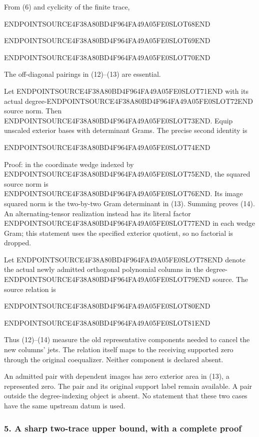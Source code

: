 From (6) and cyclicity of the finite trace,

ENDPOINTSOURCE4F38A80BD4F964FA49A05FE0SLOT68END

ENDPOINTSOURCE4F38A80BD4F964FA49A05FE0SLOT69END

ENDPOINTSOURCE4F38A80BD4F964FA49A05FE0SLOT70END

The off-diagonal pairings in (12)--(13) are essential.

Let ENDPOINTSOURCE4F38A80BD4F964FA49A05FE0SLOT71END with its actual degree-ENDPOINTSOURCE4F38A80BD4F964FA49A05FE0SLOT72END source norm. Then ENDPOINTSOURCE4F38A80BD4F964FA49A05FE0SLOT73END. Equip unscaled exterior bases with determinant Grams. The precise second identity is

ENDPOINTSOURCE4F38A80BD4F964FA49A05FE0SLOT74END

Proof: in the coordinate wedge indexed by ENDPOINTSOURCE4F38A80BD4F964FA49A05FE0SLOT75END, the squared source norm is ENDPOINTSOURCE4F38A80BD4F964FA49A05FE0SLOT76END. Its image squared norm is the two-by-two Gram determinant in (13). Summing proves (14). An alternating-tensor realization instead has its literal factor ENDPOINTSOURCE4F38A80BD4F964FA49A05FE0SLOT77END in each wedge Gram; this statement uses the specified exterior quotient, so no factorial is dropped.

Let ENDPOINTSOURCE4F38A80BD4F964FA49A05FE0SLOT78END denote the actual newly admitted orthogonal polynomial columns in the degree-ENDPOINTSOURCE4F38A80BD4F964FA49A05FE0SLOT79END source. The source relation is

ENDPOINTSOURCE4F38A80BD4F964FA49A05FE0SLOT80END

ENDPOINTSOURCE4F38A80BD4F964FA49A05FE0SLOT81END

Thus (12)--(14) measure the old representative components needed to cancel the new columns' jets. The relation itself maps to the receiving supported zero through the original coequalizer. Neither component is declared absent.

An admitted pair with dependent images has zero exterior area in (13), a represented zero. The pair and its original support label remain available. A pair outside the degree-indexing object is absent. No statement that these two cases have the same upstream datum is used.

\subsubsection{5. A sharp two-trace upper bound, with a complete proof}\label{endpoint-relation_moment_original--a-sharp-two-trace-upper-bound-with-a-complete-proof}

